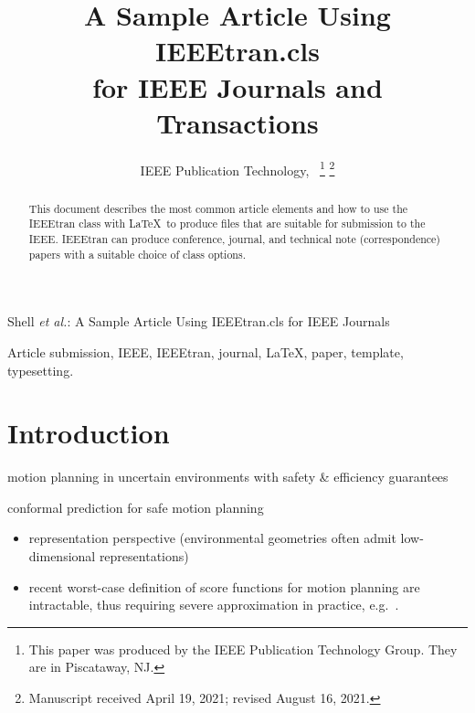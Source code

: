 \documentclass[lettersize,journal]{IEEEtran}
\begin{document}
\title{A Sample Article Using IEEEtran.cls\\ for IEEE Journals and Transactions}

\author{IEEE Publication Technology,~
\thanks{This paper was produced by the IEEE Publication Technology Group. They are in Piscataway, NJ.}%
\thanks{Manuscript received April 19, 2021; revised August 16, 2021.}}

%
{Shell \MakeLowercase{\textit{et al.}}: A Sample Article Using IEEEtran.cls for IEEE Journals}


\maketitle

\begin{abstract}
This document describes the most common article elements and how to use the IEEEtran class with \LaTeX \ to produce files that are suitable for submission to the IEEE.  IEEEtran can produce conference, journal, and technical note (correspondence) papers with a suitable choice of class options. 
\end{abstract}

\begin{IEEEkeywords}
Article submission, IEEE, IEEEtran, journal, \LaTeX, paper, template, typesetting.
\end{IEEEkeywords}

\section{Introduction}
 motion planning in uncertain environments with safety \& efficiency guarantees


conformal prediction for safe motion planning~\cite{lindemann2023safeplanning, dixit2023adaptive,lekeufack2024decision,mei2025perceive,shin2025egocentric,contreras2025safe,sundarsingh2026safe}


\begin{itemize}
    \item representation perspective (environmental geometries often admit low-dimensional representations)

    \item recent worst-case definition of score functions for motion planning are intractable, thus requiring severe approximation in practice, e.g.~\cite{mei2025perceive,sundarsingh2026safe}.
\end{itemize}
\end{document}
